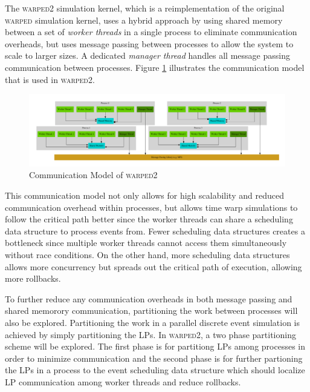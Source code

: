 \documentclass[11pt]{book}
\begin{document}
The \textsc{warped2} simulation kernel, which is a reimplementation of the original
\textsc{warped} simulation kernel, uses a hybrid approach by using shared memory between a set
of \emph{worker threads} in a single process to eliminate communication overheads, but uses
message passing between processes to allow the system to scale to larger sizes. A dedicated
\emph{manager thread} handles all message passing communication between
processes. Figure \ref{warped2_communication} illustrates the communication model that is
used in \textsc{warped2}.

\begin{figure}[H]
    \centering
    \includegraphics[width=\textwidth,quiet]{figs/graphviz/warped_communication.pdf}
    \caption{Communication Model of \textsc{warped2}}\label{warped2_communication}
\end{figure}

\noindent
This communication model not only allows for high scalability and reduced communication
overhead within processes, but allows time warp simulations to follow the critical path better
since the worker threads can share a scheduling data structure to process events from.
Fewer scheduling data structures creates a bottleneck since multiple worker threads cannot
access them simultaneously without race conditions. On the other hand, more scheduling
data structures allows more concurrency but spreads out the critical path of execution,
allowing more rollbacks.

To further reduce any communication overheads in both message passing and shared memorory
communication, partitioning the work between processes will also be explored. Partitioning
the work in a parallel discrete event simulation is achieved by simply partitioning the
LPs. In \textsc{warped2}, a two phase partitioning scheme will be explored. The first phase
is for partitiong LPs among processes in order to minimize communication and the second
phase is for further partioning the LPs in a process to the event scheduling data structure
which should localize LP communication among worker threads and reduce rollbacks.
\end{document}
